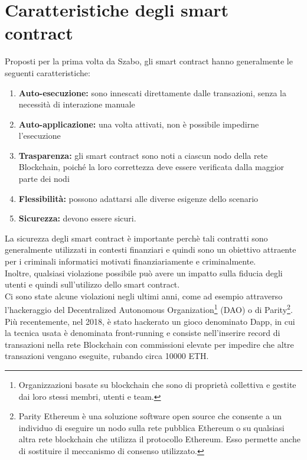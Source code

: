 \documentclass[a4paper,11pt]{report}
\begin{document}
\section{Caratteristiche degli smart contract}
Proposti per la prima volta da Szabo, gli smart contract hanno generalmente le seguenti caratteristiche:
\begin{enumerate}
\item \textbf{Auto-esecuzione:} sono innescati direttamente dalle transazioni, senza la necessità di interazione manuale
\item \textbf{Auto-applicazione:} una volta attivati, non è possibile impedirne l'esecuzione
\item \textbf{Trasparenza:} gli smart contract sono noti a ciascun nodo della rete Blockchain, poiché la loro correttezza deve essere verificata dalla maggior parte dei nodi
\item \textbf{Flessibilità:} possono adattarsi alle diverse esigenze dello scenario
\item \textbf{Sicurezza:} devono essere sicuri.
\end{enumerate}
La sicurezza degli smart contract è importante perchè tali contratti sono generalmente utilizzati in contesti finanziari e quindi sono un obiettivo attraente per i criminali informatici motivati finanziariamente e criminalmente.\\
Inoltre, qualsiasi violazione possibile può avere un impatto sulla fiducia degli utenti e quindi sull'utilizzo dello smart contract.\\
Ci sono state alcune violazioni negli ultimi anni, come ad esempio attraverso l'hackeraggio del Decentralized Autonomous Organization\footnote{Organizzazioni basate su blockchain che sono di proprietà collettiva e gestite dai loro stessi membri, utenti e team.} (DAO) o di Parity\footnote{Parity Ethereum è una soluzione software open source che consente a un individuo di eseguire un nodo sulla rete pubblica Ethereum o su qualsiasi altra rete blockchain che utilizza il protocollo Ethereum. Esso permette anche di sostituire il meccanismo di consenso utilizzato.}. Più recentemente, nel 2018, è stato hackerato un gioco denominato Dapp, in cui la tecnica usata è denominata front-running e consiste nell'inserire record di transazioni nella rete Blockchain con commissioni elevate per impedire che altre transazioni vengano eseguite, rubando circa 10000 ETH.
\end{document}
